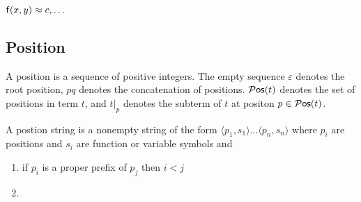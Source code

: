 \documentclass[ 
xcolor={usenames,dvipsnames,svgnames,tablem} 
,handout
]{beamer}
\begin{document}
\begin{frame}
${\mathsf f}(x,y)\approx c, \ldots$
\end{frame}


\subsection{Position}
\begin{frame}
\begin{definition}
A position is a sequence of positive integers.
The empty sequence $\varepsilon$ denotes the root position,
$pq$ denotes the concatenation of positions. 
${}{\mathcal P}\mathsf{os}(t)$ denotes the set of positions in term $t$, and $t|_p$ denotes the subterm of $t$ at positon $p\in{}{\mathcal P}\mathsf{os}(t)$.
\end{definition}

\begin{definition}
A postion string is a nonempty string of the form $\langle p_1,s_1\rangle\ldots\langle p_n,s_n\rangle$
where $p_i$ are positions and $s_i$ are function or variable symbols and
\begin{enumerate}
\item
if $p_i$ is a proper prefix of $p_j$ then $i<j$
\item
\end{enumerate}
\end{definition}
\end{frame}
\end{document}
